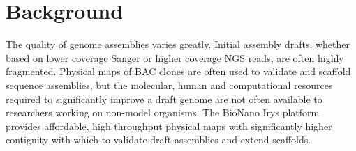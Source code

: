 \documentclass{bmcart}
\begin{document}
\begin{frontmatter}
\begin{abstractbox}
\begin{keyword}
\end{keyword}


\end{abstractbox}
%

\end{frontmatter}



\section*{Background}
The quality of genome assemblies varies greatly. Initial assembly drafts, whether based on lower coverage Sanger or higher coverage NGS reads, are often highly fragmented. Physical maps of BAC clones are often used to validate and scaffold sequence assemblies, but the molecular, human and computational resources required to significantly improve a draft genome are not often available to researchers working on non-model organisms. The BioNano Irys platform provides affordable, high throughput physical maps with significantly higher contiguity with which to validate draft assemblies and extend scaffolds.
\end{document}
